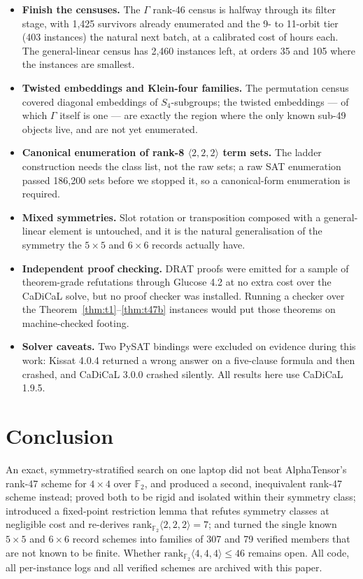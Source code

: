 \documentclass[11pt]{article}
\newcommand{\FF}{\mathbb{F}_2}
\newcommand{\tw}[3]{\langle #1,#2,#3\rangle}
\begin{document}
\begin{itemize}
\item \textbf{Finish the censuses.} The $\Gamma$ rank-46 census is halfway through its filter stage, with
1{,}425 survivors already enumerated and the 9- to 11-orbit tier (403 instances) the natural next batch,
at a calibrated cost of hours each. The general-linear census has 2{,}460 instances left, at orders 35
and 105 where the instances are smallest.
\item \textbf{Twisted embeddings and Klein-four families.} The permutation census covered diagonal
embeddings of $S_4$-subgroups; the twisted embeddings --- of which $\Gamma$ itself is one --- are exactly
the region where the only known sub-49 objects live, and are not yet enumerated.
\item \textbf{Canonical enumeration of rank-8 $\tw222$ term sets.} The ladder construction needs the
class list, not the raw sets; a raw SAT enumeration passed 186{,}200 sets before we stopped it, so a
canonical-form enumeration is required.
\item \textbf{Mixed symmetries.} Slot rotation or transposition composed with a general-linear element is
untouched, and it is the natural generalisation of the symmetry the $5\times5$ and $6\times6$ records
actually have.
\item \textbf{Independent proof checking.} DRAT proofs were emitted for a sample of theorem-grade
refutations through Glucose 4.2 at no extra cost over the CaDiCaL solve, but no proof checker was
installed. Running a checker over the Theorem~\ref{thm:t1}--\ref{thm:t47b} instances would put those
theorems on machine-checked footing.
\item \textbf{Solver caveats.} Two PySAT bindings were excluded on evidence during this work: Kissat
4.0.4 returned a wrong answer on a five-clause formula and then crashed, and CaDiCaL 3.0.0 crashed
silently. All results here use CaDiCaL 1.9.5.
\end{itemize}

\section{Conclusion}

An exact, symmetry-stratified search on one laptop did not beat AlphaTensor's rank-47 scheme for
$4\times4$ over $\FF$, and produced a second, inequivalent rank-47 scheme instead; proved both to be
rigid and isolated within their symmetry class; introduced a fixed-point restriction lemma that refutes
symmetry classes at negligible cost and re-derives $\mathrm{rank}_{\FF}\tw222=7$; and turned the single
known $5\times5$ and $6\times6$ record schemes into families of 307 and 79 verified members that are not
known to be finite. Whether $\mathrm{rank}_{\FF}\tw444 \leq 46$ remains open. All code, all per-instance
logs and all verified schemes are archived with this paper.
\end{document}
